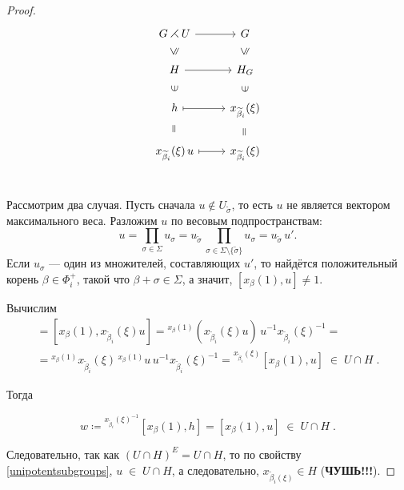 \documentclass[10pt]{article}
\theoremstyle{remark}
\renewcommand{\le}{\leqslant}
\begin{document}
\begin{proof}
\begin{equation*}
\tikzset{
  Subgroup/.style={
    draw=none,
    every to/.append style={
      edge node={node [sloped, allow upside down, auto=false]{$\le$}}}},
  Equals/.style={
    draw=none,
    every to/.append style={
      edge node={node [sloped, allow upside down, auto=false]{$=$}}}},
  Included/.style={
    draw=none,
    every to/.append style={
      edge node={node [sloped, allow upside down, auto=false]{$\in$}}}}
}
\begin{tikzcd}
G \rightthreetimes U \arrow{r}{} & G \\
H \arrow[Subgroup]{u} \arrow{r}{} & H_G \arrow[Subgroup]{u} \\
h \arrow[Included]{u} \arrow[maps to]{r}{} & x_{\widetilde\beta_i}(\xi) \arrow[Included]{u} \\
x_{\widetilde\beta_i}(\xi)\,u \arrow[Equals]{u} \arrow[maps to]{r}{} & x_{\widetilde\beta_i}(\xi) \arrow[Equals]{u} \\
\end{tikzcd}
\end{equation*}

Рассмотрим два случая. Пусть сначала $u \notin U_{\widetilde\sigma}$, то есть $u$ не является вектором максимального веса. Разложим $u$ по весовым подпространствам: $$u = \prod_{\sigma \in \Sigma} u_\sigma = u_{\widetilde\sigma} \, \prod_{\sigma \in \Sigma \setminus \{\widetilde\sigma\} } u_\sigma = u_{\widetilde\sigma} \, u'  .$$
Если $u_\sigma$ --- один из множителей, составляющих $u'$, то найдётся положительный корень $\beta \in \Phi_i^+$, такой что $\beta + \sigma \in \Sigma$, а значит, $[x_\beta(1), u] \ne 1$.

Вычислим
\begin{multline*}
[x_\beta(1), h] = [x_\beta(1), x_{\widetilde\beta_i}(\xi)u] =
{}^{x_\beta(1)}(x_{\widetilde\beta_i}(\xi)u)\,u^{-1} {x_{\widetilde\beta_i}(\xi)}^{-1}
= \\ =
{}^{x_\beta(1)}x_{\widetilde\beta_i}(\xi) \, {}^{x_\beta(1)}u\,u^{-1} {x_{\widetilde\beta_i}(\xi)}^{-1} =
{}^{x_{\widetilde\beta_i}(\xi)}[x_\beta(1),u] \; \in \; U \cap H \; .
\end{multline*}

Тогда 

$$ w \coloneqq {}^{x_{\widetilde\beta_i}(\xi)^{-1}} [x_\beta(1), h] = [x_\beta(1),u] \; \in \; U \cap H \; .$$

Следовательно, так как $(U \cap H)^E = U \cap H$, то по свойству \ref{unipotentsubgroups}, $u \; \in \; U \cap H$, а следовательно, $x_{\widetilde\beta_i(\xi)} \in H$ (\textbf{\color{red}ЧУШЬ!!!}).


\end{proof}
\end{document}
